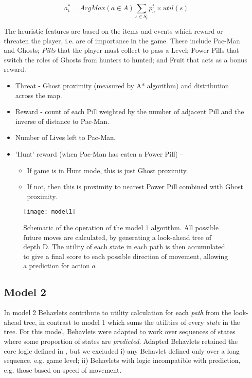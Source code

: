 \documentclass[conference]{IEEEtran}
\begin{document}
\begin{equation}
	a_t^* = ArgMax(a \in A) \sum_{s \in S_t} p_a^t \times util(s)
	\label{eq.model1}
\end{equation}

The heuristic features are based on the items and events which reward or threaten the player, i.e. are of importance in the game. These include Pac-Man and Ghosts; \textit{Pills} that the player must collect to pass a Level; Power Pills that switch the roles of Ghosts from hunters to hunted; and Fruit that acts as a bonus reward.

\begin{itemize}
	\item Threat - Ghost proximity (measured by A* algorithm) and distribution across the map.

	\item Reward - count of each Pill weighted by the number of adjacent Pill and the inverse of distance to Pac-Man.

	\item Number of Lives left to Pac-Man.

	\item 'Hunt' reward (when Pac-Man has eaten a Power Pill) –
	\begin{itemize}
		\item If game is in Hunt mode, this is just Ghost proximity.

		\item If not, then this is proximity to nearest Power Pill combined with Ghost proximity.
	\end{itemize}
\end{itemize}


\begin{figure*}[!ht]
	\centering
	\texttt{[image: model1]}
	\caption{Schematic of the operation of the model 1 algorithm. All possible future moves are calculated, by generating a look-ahead tree of depth D. The utility of each state in each path is then accumulated to give a final score to each possible direction of movement, allowing a prediction for action $a$}
	\label{fig.model1}
\end{figure*}


\subsection{Model 2}
In model 2 Behavlets contribute to utility calculation for each \textit{path} from the look-ahead tree, in contrast to model 1 which sums the utilities of every \textit{state} in the tree. For this model, Behavlets were adapted to work over sequences of states where some proportion of states are \textit{predicted}. Adapted Behavlets retained the core logic defined in \cite{Cowley2016behavlet}, but we excluded i) any Behavlet defined only over a long sequence, e.g. game level; ii) Behavlets with logic incompatible with prediction, e.g. those based on speed of movement. 
\end{document}
